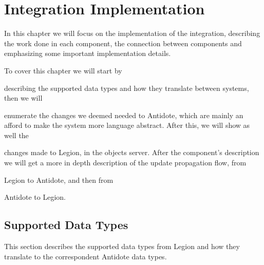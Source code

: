\chapter{Integration Implementation}
\label{cha:integration_implementation}

In this chapter we will focus on the implementation of the integration, describing the work done in each component, the connection between components and emphasizing some important implementation details.\par
	To cover this chapter we will start by
\begin{enumerate*}[(i)]

\item describing the supported data types and how they translate between systems, then we will 

\item enumerate the changes we deemed needed to Antidote, which are mainly an afford to make the system more language abstract. After this, we will show as well the 

\item changes made to Legion, in the objects server. After the component's description we will get a more in depth description of the update propagation flow, from

\item Legion to Antidote, and then from

\item Antidote to Legion.

\end{enumerate*}	

\section{Supported Data Types}
\label{sec:supported_data_types}
This section describes the supported data types from Legion and how they translate to the correspondent Antidote data types.


